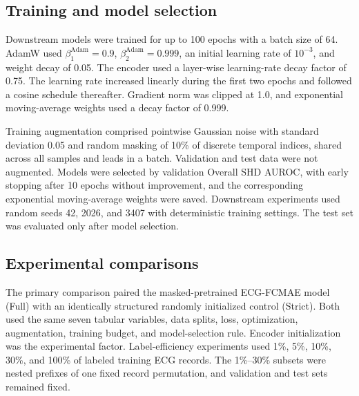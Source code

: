 \BSPCseparatearchitecturefigures

\subsection{Training and model selection}
\label{sec:training}

Downstream models were trained for up to 100 epochs with a batch size of 64. AdamW used $\beta^{\mathrm{Adam}}_1=0.9$, $\beta^{\mathrm{Adam}}_2=0.999$, an initial learning rate of $10^{-3}$, and weight decay of 0.05. The encoder used a layer-wise learning-rate decay factor of 0.75. The learning rate increased linearly during the first two epochs and followed a cosine schedule thereafter. Gradient norm was clipped at 1.0, and exponential moving-average weights used a decay factor of 0.999.

Training augmentation comprised pointwise Gaussian noise with standard deviation 0.05 and random masking of 10\% of discrete temporal indices, shared across all samples and leads in a batch. Validation and test data were not augmented. Models were selected by validation Overall SHD AUROC, with early stopping after 10 epochs without improvement, and the corresponding exponential moving-average weights were saved. Downstream experiments used random seeds 42, 2026, and 3407 with deterministic training settings. The test set was evaluated only after model selection.

\subsection{Experimental comparisons}
\label{sec:comparisons}

The primary comparison paired the masked-pretrained ECG-FCMAE model (Full) with an identically structured randomly initialized control (Strict). Both used the same seven tabular variables, data splits, loss, optimization, augmentation, training budget, and model-selection rule. Encoder initialization was the experimental factor. Label-efficiency experiments used 1\%, 5\%, 10\%, 30\%, and 100\% of labeled training ECG records. The 1\%--30\% subsets were nested prefixes of one fixed record permutation, and validation and test sets remained fixed.

